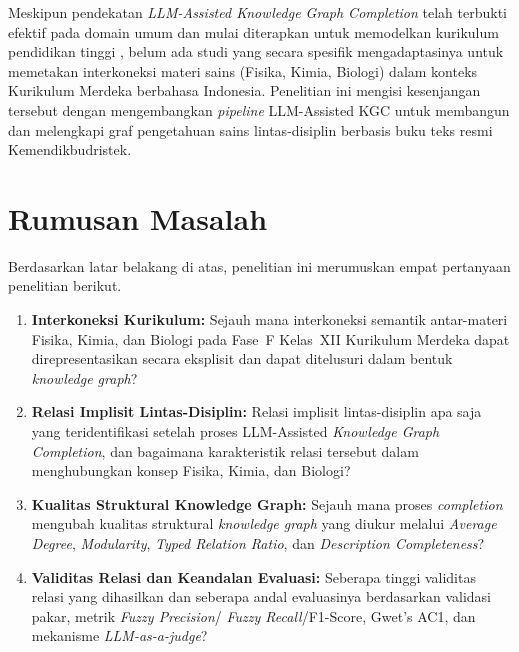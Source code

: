 \documentclass[../../thesis]{subfiles}
\begin{document}
Meskipun pendekatan \textit{LLM-Assisted Knowledge Graph Completion} telah
terbukti efektif pada domain umum dan mulai diterapkan untuk memodelkan
kurikulum pendidikan tinggi \parencite{abu-rasheed_llm-assisted_2025}, belum ada
studi yang secara spesifik mengadaptasinya untuk memetakan interkoneksi materi
sains (Fisika, Kimia, Biologi) dalam konteks Kurikulum Merdeka berbahasa
Indonesia. Penelitian ini
mengisi kesenjangan tersebut dengan mengembangkan \textit{pipeline}
LLM-Assisted KGC untuk membangun dan melengkapi graf pengetahuan sains
lintas-disiplin berbasis buku teks resmi Kemendikbudristek.

\section{Rumusan Masalah}

Berdasarkan latar belakang di atas, penelitian ini merumuskan empat pertanyaan
penelitian berikut.

\begin{enumerate}
  \item \textbf{Interkoneksi Kurikulum:} Sejauh mana interkoneksi semantik
        antar-materi Fisika, Kimia, dan Biologi pada Fase~F Kelas~XII Kurikulum
        Merdeka dapat direpresentasikan secara eksplisit dan dapat ditelusuri
        dalam bentuk \textit{knowledge graph}?

  \item \textbf{Relasi Implisit Lintas-Disiplin:} Relasi implisit lintas-disiplin
        apa saja yang teridentifikasi setelah proses LLM-Assisted
        \textit{Knowledge Graph Completion}, dan bagaimana karakteristik relasi
        tersebut dalam menghubungkan konsep Fisika, Kimia, dan Biologi?

  \item \textbf{Kualitas Struktural Knowledge Graph:} Sejauh mana proses
        \textit{completion} mengubah kualitas struktural
        \textit{knowledge graph} yang diukur melalui \textit{Average Degree},
        \textit{Modularity}, \textit{Typed Relation Ratio}, dan
        \textit{Description Completeness}?

  \item \textbf{Validitas Relasi dan Keandalan Evaluasi:} Seberapa tinggi
        validitas relasi yang dihasilkan dan seberapa andal evaluasinya
        berdasarkan validasi pakar, metrik \textit{Fuzzy Precision}/
        \textit{Fuzzy Recall}/F1-Score, Gwet's AC1, dan mekanisme
        \textit{LLM-as-a-judge}?
\end{enumerate}
\end{document}
